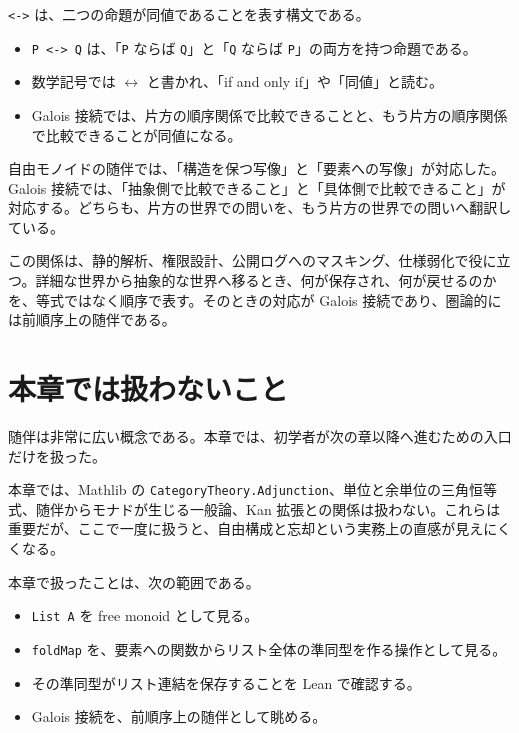\begin{syntaxbox}
\texttt{<->} は、二つの命題が同値であることを表す構文である。
\begin{itemize}
\item \texttt{P <-> Q} は、「\texttt{P} ならば \texttt{Q}」と「\texttt{Q} ならば \texttt{P}」の両方を持つ命題である。
\item 数学記号では \(\leftrightarrow\) と書かれ、「if and only if」や「同値」と読む。
\item Galois 接続では、片方の順序関係で比較できることと、もう片方の順序関係で比較できることが同値になる。
\end{itemize}
\end{syntaxbox}

\begin{intuitionbox}
自由モノイドの随伴では、「構造を保つ写像」と「要素への写像」が対応した。Galois 接続では、「抽象側で比較できること」と「具体側で比較できること」が対応する。どちらも、片方の世界での問いを、もう片方の世界での問いへ翻訳している。
\end{intuitionbox}

この関係は、静的解析、権限設計、公開ログへのマスキング、仕様弱化で役に立つ。詳細な世界から抽象的な世界へ移るとき、何が保存され、何が戻せるのかを、等式ではなく順序で表す。そのときの対応が Galois 接続であり、圏論的には前順序上の随伴である。

\section{本章では扱わないこと}
\label{sec:ch31-boundary}

随伴は非常に広い概念である。本章では、初学者が次の章以降へ進むための入口だけを扱った。

\begin{warningbox}
本章では、Mathlib の \texttt{CategoryTheory.Adjunction}、単位と余単位の三角恒等式、随伴からモナドが生じる一般論、Kan 拡張との関係は扱わない。これらは重要だが、ここで一度に扱うと、自由構成と忘却という実務上の直感が見えにくくなる。
\end{warningbox}

本章で扱ったことは、次の範囲である。

\begin{itemize}
\item \texttt{List A} を free monoid として見る。
\item \texttt{foldMap} を、要素への関数からリスト全体の準同型を作る操作として見る。
\item その準同型がリスト連結を保存することを Lean で確認する。
\item Galois 接続を、前順序上の随伴として眺める。
\end{itemize}

